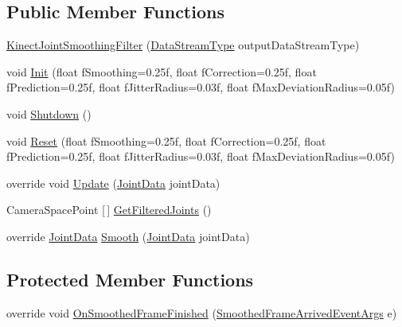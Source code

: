 \subsection*{Public Member Functions}
\begin{DoxyCompactItemize}
\item 
\hyperlink{class_rowing_monitor_1_1_model_1_1_pipeline_1_1_kinect_joint_smoothing_filter_a66e7c67626da3288c67427b6aa8f974b}{Kinect\+Joint\+Smoothing\+Filter} (\hyperlink{namespace_rowing_monitor_1_1_model_1_1_util_a01e1a06061533b246feb7421c9d0107f}{Data\+Stream\+Type} output\+Data\+Stream\+Type)
\item 
void \hyperlink{class_rowing_monitor_1_1_model_1_1_pipeline_1_1_kinect_joint_smoothing_filter_a77e9c9b72aeeb466af5d5f6791e1d568}{Init} (float f\+Smoothing=0.\+25f, float f\+Correction=0.\+25f, float f\+Prediction=0.\+25f, float f\+Jitter\+Radius=0.\+03f, float f\+Max\+Deviation\+Radius=0.\+05f)
\item 
void \hyperlink{class_rowing_monitor_1_1_model_1_1_pipeline_1_1_kinect_joint_smoothing_filter_a3f04af3eae0d014a73ac950c685b669b}{Shutdown} ()
\item 
void \hyperlink{class_rowing_monitor_1_1_model_1_1_pipeline_1_1_kinect_joint_smoothing_filter_a47c8d921b68fbf92a773a83c9ab602b7}{Reset} (float f\+Smoothing=0.\+25f, float f\+Correction=0.\+25f, float f\+Prediction=0.\+25f, float f\+Jitter\+Radius=0.\+03f, float f\+Max\+Deviation\+Radius=0.\+05f)
\item 
override void \hyperlink{class_rowing_monitor_1_1_model_1_1_pipeline_1_1_kinect_joint_smoothing_filter_a93cb6db0e00796dd2791789e472457b5}{Update} (\hyperlink{struct_rowing_monitor_1_1_model_1_1_util_1_1_joint_data}{Joint\+Data} joint\+Data)
\item 
Camera\+Space\+Point \mbox{[}$\,$\mbox{]} \hyperlink{class_rowing_monitor_1_1_model_1_1_pipeline_1_1_kinect_joint_smoothing_filter_aac138f87f70caab7b0c14071b52e84c7}{Get\+Filtered\+Joints} ()
\item 
override \hyperlink{struct_rowing_monitor_1_1_model_1_1_util_1_1_joint_data}{Joint\+Data} \hyperlink{class_rowing_monitor_1_1_model_1_1_pipeline_1_1_kinect_joint_smoothing_filter_a31ee74610f6c7de082306691f59d2f1c}{Smooth} (\hyperlink{struct_rowing_monitor_1_1_model_1_1_util_1_1_joint_data}{Joint\+Data} joint\+Data)
\end{DoxyCompactItemize}
\subsection*{Protected Member Functions}
\begin{DoxyCompactItemize}
\item 
override void \hyperlink{class_rowing_monitor_1_1_model_1_1_pipeline_1_1_kinect_joint_smoothing_filter_a944294caee0b2b26c0023a1c2d0c1a67}{On\+Smoothed\+Frame\+Finished} (\hyperlink{class_rowing_monitor_1_1_model_1_1_smoothed_frame_arrived_event_args}{Smoothed\+Frame\+Arrived\+Event\+Args} e)
\end{DoxyCompactItemize}
